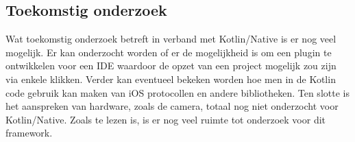 \documentclass[a0,portrait]{a0poster}
\begin{document}
\begin{multicols}{2}
\section*{Toekomstig onderzoek}
\color{black}
Wat toekomstig onderzoek betreft in verband met Kotlin/Native is er nog veel mogelijk. Er kan onderzocht worden of er de mogelijkheid is om een plugin te ontwikkelen voor een IDE waardoor de opzet van een project mogelijk zou zijn via enkele klikken. Verder kan eventueel bekeken worden hoe men in de Kotlin code gebruik kan maken van iOS protocollen en andere bibliotheken. Ten slotte is het aanspreken van hardware, zoals de camera, totaal nog niet onderzocht voor Kotlin/Native. Zoals te lezen is, is er nog veel ruimte tot onderzoek voor dit framework.


\end{multicols}
\end{document}

